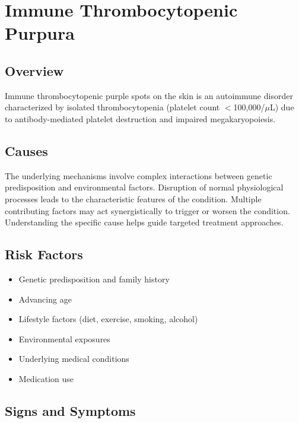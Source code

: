 \chapter{Immune Thrombocytopenic Purpura}
\label{sec:Immune Thrombocytopenic Purpura}

\section{Overview}
Immune thrombocytopenic purple spots on the skin is an autoimmune disorder characterized by isolated thrombocytopenia (platelet count $<$100,000/$\mu$L) due to antibody-mediated platelet destruction and impaired megakaryopoiesis.
\section{Causes}
The underlying mechanisms involve complex interactions between genetic predisposition and environmental factors. Disruption of normal physiological processes leads to the characteristic features of the condition. Multiple contributing factors may act synergistically to trigger or worsen the condition. Understanding the specific cause helps guide targeted treatment approaches.
\section{Risk Factors}


\begin{itemize}[noitemsep]
  \item Genetic predisposition and family history
  \item Advancing age
  \item Lifestyle factors (diet, exercise, smoking, alcohol)
  \item Environmental exposures
  \item Underlying medical conditions
  \item Medication use
\end{itemize}
\section{Signs and Symptoms}

